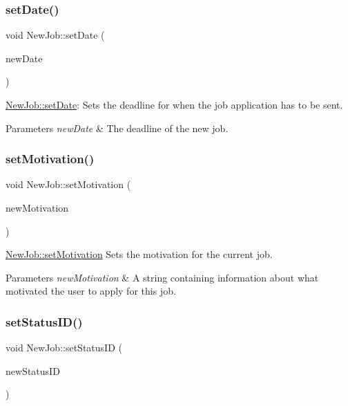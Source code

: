 \subsubsection{\texorpdfstring{set\+Date()}{setDate()}}
{\footnotesize\ttfamily void New\+Job\+::set\+Date (\begin{DoxyParamCaption}\item[{Q\+String}]{new\+Date }\end{DoxyParamCaption})}



\hyperlink{class_new_job_a0a1d9067e72f797ad3b1f01d44fedb0f}{New\+Job\+::set\+Date}\+: Sets the deadline for when the job application has to be sent. 


\begin{DoxyParams}{Parameters}
{\em new\+Date} & The deadline of the new job. \\
\hline
\end{DoxyParams}
\mbox{\label{class_new_job_a3ddb9ee8bccdf069711406effb9d7dcd}} 
\subsubsection{\texorpdfstring{set\+Motivation()}{setMotivation()}}
{\footnotesize\ttfamily void New\+Job\+::set\+Motivation (\begin{DoxyParamCaption}\item[{Q\+String}]{new\+Motivation }\end{DoxyParamCaption})}



\hyperlink{class_new_job_a3ddb9ee8bccdf069711406effb9d7dcd}{New\+Job\+::set\+Motivation} Sets the motivation for the current job. 


\begin{DoxyParams}{Parameters}
{\em new\+Motivation} & A string containing information about what motivated the user to apply for this job. \\
\hline
\end{DoxyParams}
\mbox{\label{class_new_job_aa184d2046d0e60e82cd5840c40b99bed}} 
\subsubsection{\texorpdfstring{set\+Status\+I\+D()}{setStatusID()}}
{\footnotesize\ttfamily void New\+Job\+::set\+Status\+ID (\begin{DoxyParamCaption}\item[{int}]{new\+Status\+ID }\end{DoxyParamCaption})}



